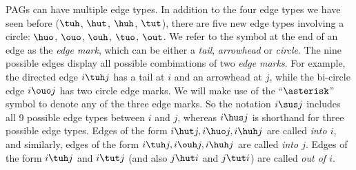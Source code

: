 PAGs can have multiple edge types. In addition to the four edge types we have seen before
($\tuh$, $\hut$, $\huh$, $\tut$), there are five new edge types involving a circle: $\huo$, $\ouo$, $\ouh$, $\tuo$, $\out$.
We refer to the symbol at the end of an edge as the \emph{edge mark}, which can be either a \emph{tail}, \emph{arrowhead} or \emph{circle}.
The nine possible edges display all possible combinations of two \emph{edge marks}.
For example, the directed edge $i \tuh j$ has a tail at $i$ and an arrowhead at $j$, while the bi-circle edge $i \ouo j$ has two circle edge marks.
We will make use of the ``$\asterisk$'' symbol to denote any of the three edge marks. 
So the notation $i \sus j$ includes all 9 possible edge types between $i$ and $j$, whereas $i \hus j$ is shorthand for three possible edge types.
Edges of the form $i \hut j, i \huo j, i \huh j$ are called \emph{into $i$}, and similarly, edges of the form $i \tuh j, i \ouh j, i \huh j$ are called \emph{into $j$}. Edges of the form $i \tuh j$ and $i \tut j$ (and also $j \hut i$ and $j \tut i$) are called \emph{out of $i$}.

